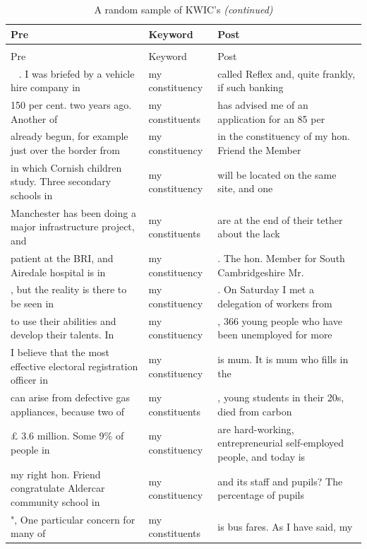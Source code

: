 \documentclass[]{article}
\theoremstyle{definition}
\theoremstyle{definition}
\theoremstyle{definition}
\theoremstyle{remark}
\begin{document}
\begin{longtabu} to 
\caption{\label{tab:constituent-kwic}A random sample of KWIC's}\\
\toprule
Pre & Keyword & Post\\
\midrule
\endfirsthead
\caption[]{\label{tab:constituent-kwic}A random sample of KWIC's \textit{(continued)}}\\
\toprule
Pre & Keyword & Post\\
\midrule
\endhead
\
\endfoot
\bottomrule
\endlastfoot
. I was briefed by a vehicle hire company in & my constituency & called Reflex and, quite frankly, if such banking\\
150 per cent. two years ago. Another of & my constituents & has advised me of an application for an 85 per\\
already begun, for example just over the border from & my constituency & in the constituency of my hon. Friend the Member\\
in which Cornish children study. Three secondary schools in & my constituency & will be located on the same site, and one\\
Manchester has been doing a major infrastructure project, and & my constituents & are at the end of their tether about the lack\\
\addlinespace
patient at the BRI, and Airedale hospital is in & my constituency & . The hon. Member for South Cambridgeshire Mr.\\
, but the reality is there to be seen in & my constituency & . On Saturday I met a delegation of workers from\\
to use their abilities and develop their talents. In & my constituency & , 366 young people who have been unemployed for more\\
I believe that the most effective electoral registration officer in & my constituency & is mum. It is mum who fills in the\\
can arise from defective gas appliances, because two of & my constituents & , young students in their 20s, died from carbon\\
\addlinespace
£ 3.6 million. Some 9\% of people in & my constituency & are hard-working, entrepreneurial self-employed people, and today is\\
my right hon. Friend congratulate Aldercar community school in & my constituency & and its staff and pupils? The percentage of pupils\\
",  One particular concern for many of & my constituents & is bus fares. As I have said, my\\

\end{longtabu}
\end{document}
